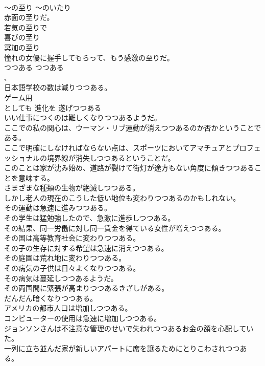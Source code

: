 \documentclass[8pt]{extreport}
\begin{document}
\begin{CJK}{UTF8}{min}
\\	〜の至り	〜のいたり	
\\	赤面の至りだ。  
\\	若気の至りで   
\\	喜びの至り   
\\	冥加の至り   
\\	憧れの女優に握手してもらって、もう感激の至りだ。  
\\	つつある	つつある	
\\	､
\\	日本語学校の数は減りつつある。 
\\	ゲーム用
\\	としても 進化を 遂げつつある
\\	いい仕事につくのは難しくなりつつあるようだ。   
\\	ここでの私の関心は、ウーマン・リブ運動が消えつつあるのか否かということである。   
\\	ここで明確にしなければならない点は、スポーツにおいてアマチュアとプロフェッショナルの境界線が消失しつつあるということだ。   
\\	このことは家が沈み始め、道路が裂けて街灯が途方もない角度に傾きつつあることを意味する。   
\\	さまざまな種類の生物が絶滅しつつある。   
\\	しかし老人の現在のこうした低い地位も変わりつつあるのかもしれない。   
\\	その運動は急速に進みつつある。   
\\	その学生は猛勉強したので、急激に進歩しつつある。   
\\	その結果、同一労働に対し同一賃金を得ている女性が増えつつある。  
\\	その国は高等教育社会に変わりつつある。   
\\	その子の生存に対する希望は急速に消えつつある。   
\\	その庭園は荒れ地に変わりつつある。   
\\	その病気の子供は日々よくなりつつある。   
\\	その病気は蔓延しつつあるようだ。   
\\	その両国間に緊張が高まりつつあるきざしがある。   
\\	だんだん暗くなりつつある。   
\\	アメリカの都市人口は増加しつつある。   
\\	コンピューターの使用は急速に増加しつつある。   
\\	ジョンソンさんは不注意な管理のせいで失われつつあるお金の額を心配していた。  
\\	一列に立ち並んだ家が新しいアパートに席を譲るためにとりこわされつつある。  

\end{CJK}
\end{document}

